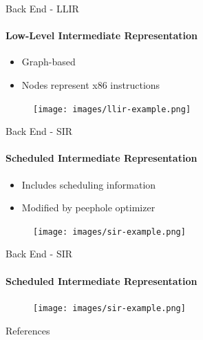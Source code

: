 \documentclass[en,16:9]{sdqbeamer}
\begin{document}
\begin{frame}{Back End - LLIR}
	\framesubtitle{Low-Level Intermediate Representation}
	
	\begin{itemize}
		\item Graph-based
		\item Nodes represent x86 instructions
	\end{itemize}

	\begin{figure}
		\centering
		\texttt{[image: images/llir-example.png]}
	\end{figure}
\end{frame}

\begin{frame}{Back End - SIR}
	\framesubtitle{Scheduled Intermediate Representation}
	
	\begin{itemize}
		\item Includes scheduling information
		\item Modified by peephole optimizer
	\end{itemize}
	
	\begin{figure}
		\centering
		\texttt{[image: images/sir-example.png]}
	\end{figure}
	
\end{frame}

\begin{frame}{Back End - SIR}
	\framesubtitle{Scheduled Intermediate Representation}
	
	\begin{figure}
		\centering
		\texttt{[image: images/sir-example.png]}
	\end{figure}
	
\end{frame}

\appendix
\beginbackup

\begin{frame}{References}
\printbibliography
\end{frame}


\backupend
\end{document}
